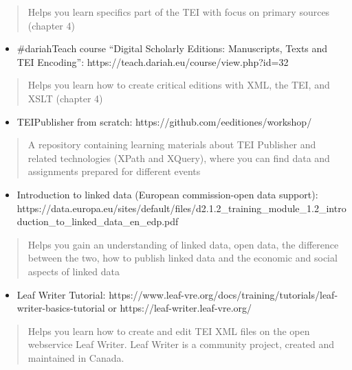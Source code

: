 \documentclass[
  letterpaper,
  DIV=11,
  numbers=noendperiod]{scrreprt}
\providecommand{\tightlist}{%
  \setlength{\itemsep}{0pt}\setlength{\parskip}{0pt}}\usepackage{longtable,booktabs,array}
\begin{document}
\begin{quote}
Helps you learn specifics part of the TEI with focus on primary sources
(chapter 4)
\end{quote}

\begin{itemize}
\tightlist
\item
  \#dariahTeach course ``Digital Scholarly Editions: Manuscripts, Texts
  and TEI Encoding'': https://teach.dariah.eu/course/view.php?id=32
\end{itemize}

\begin{quote}
Helps you learn how to create critical editions with XML, the TEI, and
XSLT (chapter 4)
\end{quote}

\begin{itemize}
\tightlist
\item
  TEIPublisher from scratch: https://github.com/eeditiones/workshop/
\end{itemize}

\begin{quote}
A repository containing learning materials about TEI Publisher and
related technologies (XPath and XQuery), where you can find data and
assignments prepared for different events
\end{quote}

\begin{itemize}
\tightlist
\item
  Introduction to linked data (European commission-open data support):
  https://data.europa.eu/sites/default/files/d2.1.2\_training\_module\_1.2\_introduction\_to\_linked\_data\_en\_edp.pdf
\end{itemize}

\begin{quote}
Helps you gain an understanding of linked data, open data, the
difference between the two, how to publish linked data and the economic
and social aspects of linked data
\end{quote}

\begin{itemize}
\tightlist
\item
  Leaf Writer Tutorial:
  https://www.leaf-vre.org/docs/training/tutorials/leaf-writer-basics-tutorial
  or https://leaf-writer.leaf-vre.org/
\end{itemize}

\begin{quote}
Helps you learn how to create and edit TEI XML files on the open
webservice Leaf Writer. Leaf Writer is a community project, created and
maintained in Canada.
\end{quote}
\end{document}
